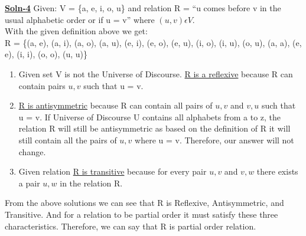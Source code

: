 \documentclass{article}
\begin{document}
\begin{enumerate}
        \textbf{\underline{Soln-4}} Given: V = \{a, e, i, o, u\} and relation R = “u comes before v in the usual alphabetic order or 
        if u = v” where $(u, v) \epsilon V$. \\
        With the given definition above we get: \\
        R = \{(a, e), (a, i), (a, o), (a, u), (e, i), (e, o), (e, u), (i, o), (i, u), (o, u), (a, a), (e, e), (i, i), (o, o), (u, u)\}
        
        \begin{enumerate}
            \item Given set V is not the Universe of Discourse. \underline{R is a reflexive} because R can contain pairs \(u, v\) such that u = v.
            \item \underline{R is antisymmetric} because R can contain all pairs of \(u, v\) and \(v, u\) such that u = v. If Universe of Discourse U contains 
                all alphabets from a to z, the relation R will still be antisymmetric as based on the definition of R it will still contain all the pairs 
                of \(u, v\) where u = v. Therefore, our answer will not change.
            \item Given relation \underline{R is transitive} because for every pair \(u, v\) and \(v, w\) there exists a pair \(u, w\) in the relation R.
        \end{enumerate}

        From the above solutions we can see that R is Reflexive, Antisymmetric, and Transitive. And for a relation to be partial order it must satisfy 
        these three characteristics. Therefore, we can say that R is partial order relation.


\end{enumerate}
\end{document}
